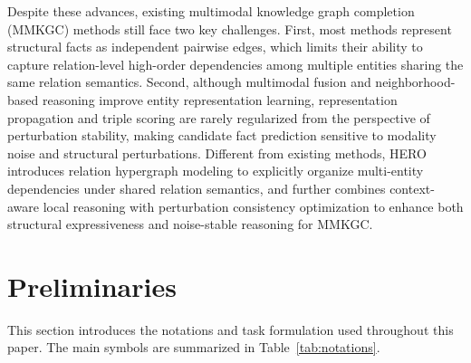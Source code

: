 \documentclass[a4paper,fleqn]{cas-sc}
\begin{document}
Despite these advances, existing multimodal knowledge graph completion (MMKGC) methods still face two key challenges. First, most methods represent structural facts as independent pairwise edges, which limits their ability to capture relation-level high-order dependencies among multiple entities sharing the same relation semantics. Second, although multimodal fusion and neighborhood-based reasoning improve entity representation learning, representation propagation and triple scoring are rarely regularized from the perspective of perturbation stability, making candidate fact prediction sensitive to modality noise and structural perturbations. Different from existing methods, HERO introduces relation hypergraph modeling to explicitly organize multi-entity dependencies under shared relation semantics, and further combines context-aware local reasoning with perturbation consistency optimization to enhance both structural expressiveness and noise-stable reasoning for MMKGC.

\section{Preliminaries}
\label{sec:preliminaries}
This section introduces the notations and task formulation used throughout this paper. The main symbols are summarized in Table~\ref{tab:notations}.
\end{document}
